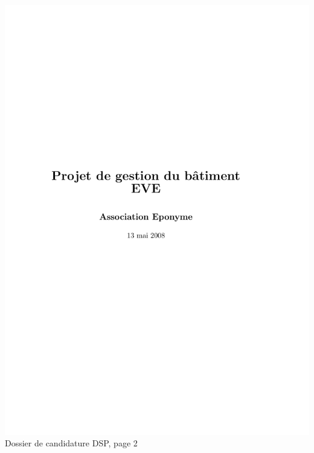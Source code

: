 \includegraphics[scale=0.85,trim=20mm 20mm 20mm 20mm,clip,page=2]{annexes/candidature_dsp.pdf} \\
Dossier de candidature DSP, page 2
\newpage

